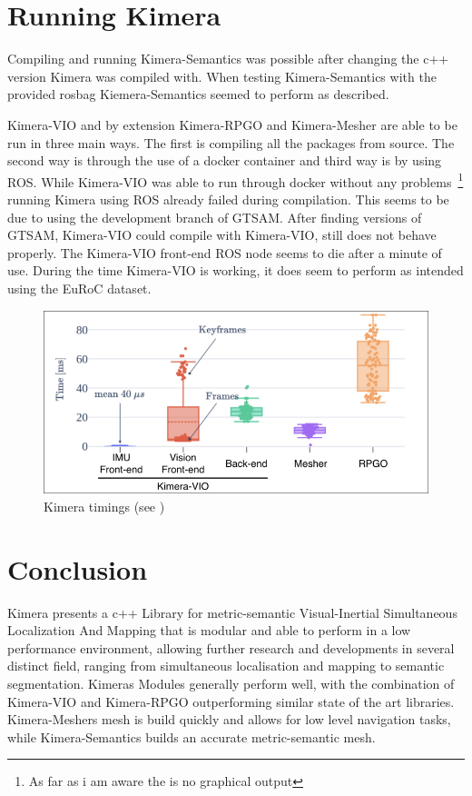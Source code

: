 \documentclass[11pt,a4paper]{article}
\begin{document}
\section{Running Kimera}
Compiling and running Kimera-Semantics was possible after changing the c++ version Kimera was compiled with.
When testing Kimera-Semantics with the provided rosbag Kiemera-Semantics seemed to perform as described.

Kimera-VIO and by extension Kimera-RPGO and Kimera-Mesher are able to be run in three main ways. 
The first is compiling all the packages from source. 
The second way is through the use of a docker container and third way is by using ROS.
While Kimera-VIO was able to run through docker without any problems~\footnote{As far as i am aware the is no graphical output} running Kimera using ROS already failed during compilation. 
This seems to be due to using the development branch of GTSAM. 
After finding versions of GTSAM, Kimera-VIO could compile with Kimera-VIO, still does not behave properly. 
The Kimera-VIO front-end ROS node seems to die after a minute of use.
During the time Kimera-VIO is working, it does seem to perform as intended using the EuRoC dataset.
\begin{figure}
  \centering
  \includegraphics[width=120mm]{Timings}
  \caption{Kimera timings (see \cite{rosinol2020kimera})}\label{Fig:Timings}  
\end{figure}

\section{Conclusion}
Kimera presents a c++ Library for metric-semantic Visual-Inertial Simultaneous Localization And Mapping that is modular and able to perform in a low performance environment, allowing further research and developments in several distinct field, ranging from simultaneous localisation and mapping to semantic segmentation.
Kimeras Modules generally perform well, with the combination of Kimera-VIO and Kimera-RPGO outperforming similar state of the art libraries.
Kimera-Meshers mesh is build quickly and allows for low level navigation tasks, while Kimera-Semantics builds an accurate metric-semantic mesh.


{\small                   %

}
\end{document}
